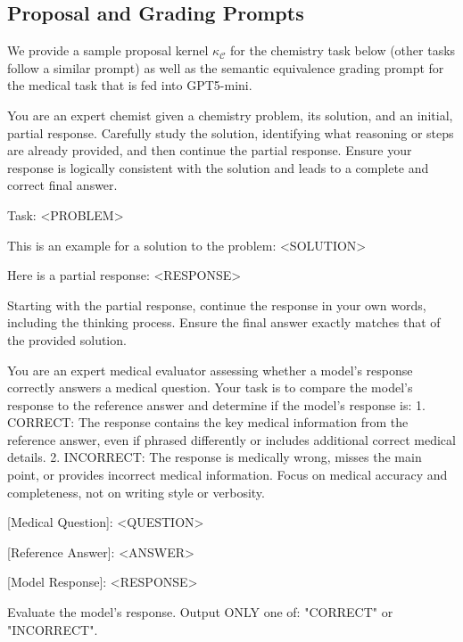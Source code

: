 \documentclass{article}
\begin{document}
\subsection{Proposal and Grading Prompts}\label{apx:prompts}
We provide a sample proposal kernel $\kappa_{\mathcal{C}}$ for the chemistry task below (other tasks follow a similar prompt) as well as the semantic equivalence grading prompt for the medical task that is fed into GPT5-mini.
\begin{promptbox}
You are an expert chemist given a chemistry problem, its solution, and an initial, partial response. Carefully study the solution,
identifying what reasoning or steps are already provided, and then continue the partial response. Ensure your response is logically consistent with the solution and leads to a complete and correct final answer.

\bigskip

Task: <PROBLEM>

\bigskip

This is an example for a solution to the problem: <SOLUTION>

\bigskip

Here is a partial response: <RESPONSE>

\bigskip


Starting with the partial response, continue the response in your own words, including the thinking process. Ensure the final answer exactly matches that of the provided solution.

\end{promptbox}




\begin{promptbox}
You are an expert medical evaluator assessing whether a model’s response correctly answers a medical question. Your task is to compare the model’s response to the reference answer and determine if the model’s response is:
1. CORRECT: The response contains the key medical information from the reference answer, even if phrased differently or includes additional correct medical details. 2. INCORRECT: The response is medically wrong, misses the main point, or provides incorrect medical information. Focus on medical accuracy and completeness, not on writing style or
verbosity. 

\bigskip

[Medical Question]: <QUESTION>

[Reference Answer]: <ANSWER>

[Model Response]: <RESPONSE>

\bigskip

Evaluate the model’s response. Output ONLY one of: "CORRECT" or "INCORRECT".
\end{promptbox}
\end{document}
